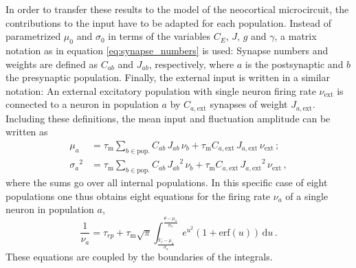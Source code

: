In order to transfer these results to the model of the neocortical microcircuit, 
the contributions to the input have to be adapted for each population. Instead of 
parametrized $\mu_0$ and $\sigma_0$ in terms of the variables $C_E$, $J$, $g$ and $\gamma$, 
a matrix notation as in equation \eqref{eq:synapse_numbers} is used: 
Synapse numbers and weights are defined as $C_{ab}$ and $J_{ab}$, respectively, 
where $a$ is the postsynaptic and $b$ the presynaptic population. 
Finally, the external input is written in a similar notation: 
An external excitatory population with single neuron firing rate $\nu_\text{ext}$ 
is connected to a neuron in population $a$ by 
$C_{a, \text{ext}}$ synapses of weight $J_{a, \text{ext}}$.
Including these definitions, the mean input and fluctuation amplitude can 
be written as 
\begin{align}
    \mu_a        &= 
        \tau_\text{m} \sum_{b \in \text{pop.}} C_{ab} \, J_{ab} \, \nu_b 
        + \tau_\text{m} C_{a, \text{ext}} \, J_{a, \text{ext}} \, \nu_\text{ext} \, ; \\
    {\sigma_a}^2 &= 
        \tau_\text{m} \sum_{b \in \text{pop.}} C_{ab} \, {J_{ab}}^2  \, \nu_b
        + \tau_\text{m} C_{a, \text{ext}} \,{J_{a, \text{ext}}}^2 \,\nu_\text{ext}\,,
\end{align}
where the sums go over all internal populations. In this specific case of eight 
populations one thus obtains eight equations for the 
firing rate $\nu_a$ of a single neuron in population $a$, 
\begin{equation}
    \frac{1}{\nu_{a}} = \tau_{rp} 
        + \tau_\text{m} \sqrt{\pi}
            \int_{\frac{V_r - \mu_{a}}{\sigma_{a}}}^{\frac{\theta - \mu_{a}}{\sigma_{a}}} 
                e^{u^2} \left(1 + \text{erf}(u)\right) \,\text{d}u  \,.
    \label{eq:self_consistency_a}
\end{equation}
These equations are coupled by the boundaries of the integrals. 



